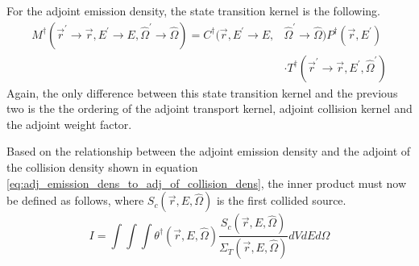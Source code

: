For the adjoint emission density, the state transition kernel is the following.
\begin{equation}
  \begin{split}
    M^{\dagger}(\vec{r}^{'} \to \vec{r},E^{'} \to E,\hat{\Omega}^{'} \to \hat{\Omega})
    = C^{\dagger}(\vec{r},E^{'} \to E,&\hat{\Omega}^{'} \to \hat{\Omega})
    P^{\dagger}(\vec{r},E^{'})  \\
    & \cdot T^{\dagger}(\vec{r}^{'} \to \vec{r},E^{'},\hat{\Omega}^{'}) 
  \end{split}
\end{equation}
Again, the only difference between this state transition kernel and the 
previous two is the the ordering of the adjoint transport kernel, adjoint
collision kernel and the adjoint weight factor. 

Based on the relationship between the adjoint emission density and the adjoint
of the collision density shown in equation 
\ref{eq:adj_emission_dens_to_adj_of_collision_dens}, the inner product must now
be defined as follows, where $S_c(\vec{r},E,\hat{\Omega})$ is the first
collided source.
\begin{equation}
  I = \int\int\int \theta^{\dagger}(\vec{r},E,\hat{\Omega})
  \frac{S_c(\vec{r},E,\hat{\Omega})}{\Sigma_T(\vec{r},E,\hat{\Omega})}
  dV dE d\hat{\Omega}
\end{equation}
